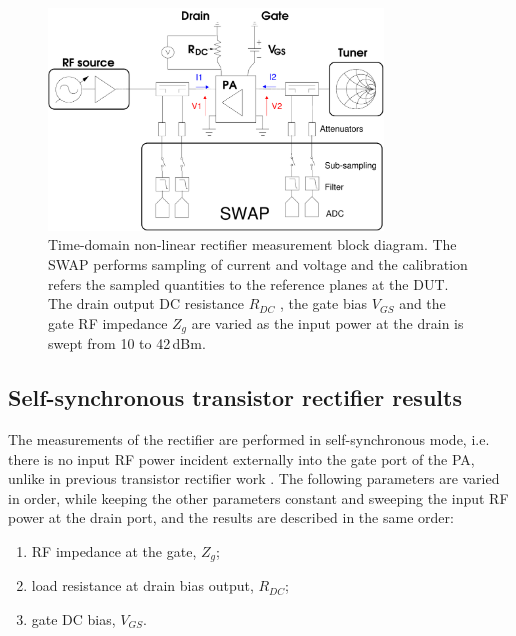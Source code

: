 \begin{figure}[ht!]
\centering
\includegraphics[width=3.5in]{pdf/10.pdf}
\caption{Time-domain non-linear rectifier measurement block diagram. The SWAP \cite{SWAP} performs sampling of current and voltage and the calibration refers the sampled quantities to the reference planes at the DUT. The drain output DC resistance $R_{DC}$ , the gate bias $V_{GS}$ and the gate RF impedance $Z_g$ are varied as the input power at the drain is swept from 10 to 42\,dBm.}
\label{measurement_setup}
\end{figure}














\subsection {Self-synchronous transistor rectifier results}

The measurements of the rectifier are performed in self-synchronous mode, i.e. there is no input RF power incident externally into the gate port of the PA, unlike in previous transistor rectifier work \cite{JoseIMS-rect,Kaz}. The following parameters are varied in order, while keeping the other parameters constant and sweeping the input RF power at the drain port, and the results are described in the same order:

\begin{enumerate}
\item RF impedance at the gate, $Z_g$;
\item load resistance at drain bias output, $R_{DC}$;
\item gate DC bias, $V_{GS}$.
\end{enumerate}

